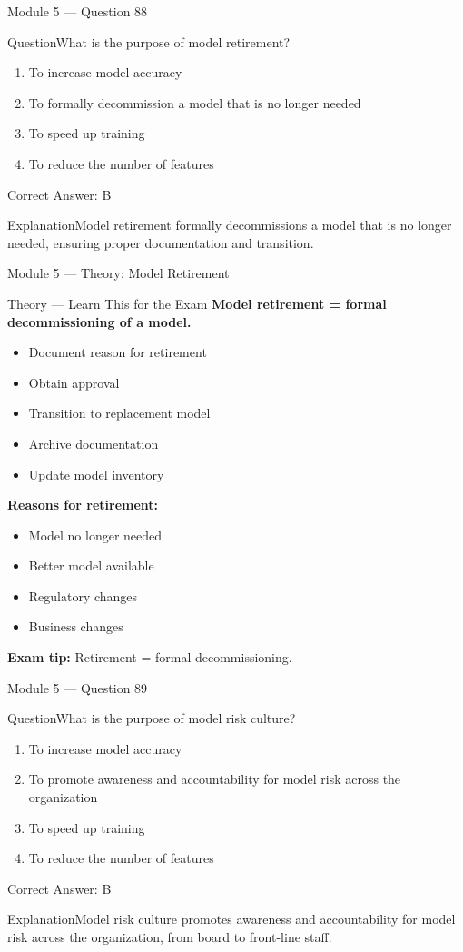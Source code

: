 \documentclass[aspectratio=169,10pt]{beamer}
\newcommand{\question}[1]{\begin{block}{Question}#1\end{block}}
\newcommand{\options}[4]{%
	\begin{enumerate}[label=\Alph*.,leftmargin=*]
		\item #1
		\item #2
		\item #3
		\item #4
	\end{enumerate}
}
\newcommand{\answerbox}[1]{\begin{exampleblock}{Correct Answer: #1}\end{exampleblock}}
\newcommand{\explain}[1]{\begin{block}{Explanation}#1\end{block}}
\newcommand{\theory}[1]{%
	\begin{block}{Theory --- Learn This for the Exam}
		\small #1
	\end{block}
}
\begin{document}
	\begin{frame}{Module 5 --- Question 88}
		\question{What is the purpose of model retirement?}
		\options{To increase model accuracy}{To formally decommission a model that is no longer needed}{To speed up training}{To reduce the number of features}
		\answerbox{B}
		\explain{Model retirement formally decommissions a model that is no longer needed, ensuring proper documentation and transition.}
	\end{frame}
	
	\begin{frame}{Module 5 --- Theory: Model Retirement}
		\theory{
			\textbf{Model retirement = formal decommissioning of a model.}
			\begin{itemize}
				\item Document reason for retirement
				\item Obtain approval
				\item Transition to replacement model
				\item Archive documentation
				\item Update model inventory
			\end{itemize}
			\textbf{Reasons for retirement:}
			\begin{itemize}
				\item Model no longer needed
				\item Better model available
				\item Regulatory changes
				\item Business changes
			\end{itemize}
			\textbf{Exam tip:} Retirement = formal decommissioning.
		}
	\end{frame}
	
	\begin{frame}{Module 5 --- Question 89}
		\question{What is the purpose of model risk culture?}
		\options{To increase model accuracy}{To promote awareness and accountability for model risk across the organization}{To speed up training}{To reduce the number of features}
		\answerbox{B}
		\explain{Model risk culture promotes awareness and accountability for model risk across the organization, from board to front-line staff.}
	\end{frame}
	
\end{document}

